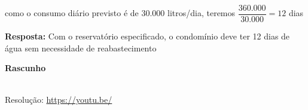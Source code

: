 como o consumo diário previsto é de 30.000 litros/dia, teremos $ \dfrac{360.000}{30.000} = 12 $ dias

\textbf{Resposta:} Com o reservatório especificado, o condomínio deve ter 12 dias de água sem necessidade de reabastecimento

\textbf{Rascunho}




\begin{center}
    \href{https://youtu.be/}{
    }\\
    Resolução: \url{https://youtu.be/}
\end{center}
